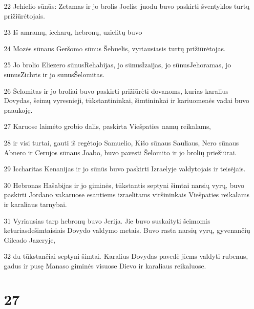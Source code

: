 \par 22 Jehielio sūnūs: Zetamas ir jo brolis Joelis; juodu buvo paskirti šventyklos turtų prižiūrėtojais. 
\par 23 Iš amramų, iccharų, hebronų, uzielitų buvo 
\par 24 Mozės sūnaus Geršomo sūnus Šebuelis, vyriausiasis turtų prižiūrėtojas. 
\par 25 Jo brolio Eliezero sūnus­Rehabijas, jo sūnus­Izaijas, jo sūnus­Jehoramas, jo sūnus­Zichris ir jo sūnus­Šelomitas. 
\par 26 Šelomitas ir jo broliai buvo paskirti prižiūrėti dovanoms, kurias karalius Dovydas, šeimų vyresnieji, tūkstantininkai, šimtininkai ir kariuomenės vadai buvo paaukoję. 
\par 27 Karuose laimėto grobio dalis, paskirta Viešpaties namų reikalams, 
\par 28 ir visi turtai, gauti iš regėtojo Samuelio, Kišo sūnaus Sauliaus, Nero sūnaus Abnero ir Cerujos sūnaus Joabo, buvo pavesti Šelomito ir jo brolių priežiūrai. 
\par 29 Iccharitas Kenanijas ir jo sūnūs buvo paskirti Izraelyje valdytojais ir teisėjais. 
\par 30 Hebronas Hašabijas ir jo giminės, tūkstantis septyni šimtai narsių vyrų, buvo paskirti Jordano vakaruose esantiems izraelitams viršininkais Viešpaties reikalams ir karaliaus tarnybai. 
\par 31 Vyriausias tarp hebronų buvo Jerija. Jie buvo suskaityti šeimomis keturiasdešimtaisiais Dovydo valdymo metais. Buvo rasta narsių vyrų, gyvenančių Gileado Jazeryje, 
\par 32 du tūkstančiai septyni šimtai. Karalius Dovydas pavedė jiems valdyti rubenus, gadus ir pusę Manaso giminės visuose Dievo ir karaliaus reikaluose.



\chapter{27}

